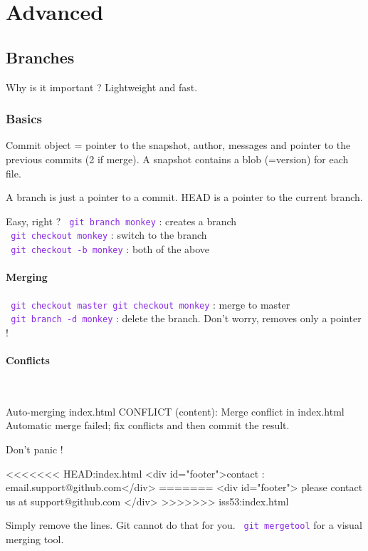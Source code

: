 \documentclass{article}
\def\cmd#1{\texttt{\textcolor{blueviolet}{#1}}}
\begin{document}
\section{Advanced}
\subsection{Branches}
Why is it important ? Lightweight and fast.

\subsubsection{Basics}
Commit object = pointer to the snapshot, author, messages and pointer to the
previous commits (2 if merge).
A snapshot contains a blob (=version) for each file.

A branch is just a pointer to a commit. HEAD is a pointer to the current branch.
\begin{figure}[h]
\end{figure}

Easy, right ?
\cmd{ git branch monkey} : creates a branch \\
\cmd{ git checkout monkey} : switch to the branch \\
\cmd{ git checkout -b monkey} : both of the above\\

\paragraph{Merging}
\cmd{ git checkout master}\cmd{ git checkout monkey} : merge to master\\
\cmd{ git branch -d monkey} : delete the branch. Don't worry, removes only a
pointer !\\

\paragraph{Conflicts} ~\\
\begin{git}
Auto-merging index.html
CONFLICT (content): Merge conflict in index.html
Automatic merge failed; fix conflicts and then commit the result.
\end{git}
Don't panic !
\begin{git}
<<<<<<< HEAD:index.html
<div id="footer">contact : email.support@github.com</div>
=======
<div id="footer">
  please contact us at support@github.com
  </div>
>>>>>>> iss53:index.html
\end{git}
Simply remove the lines. Git cannot do that for you.
\cmd{ git mergetool} for a visual merging tool.
\end{document}
